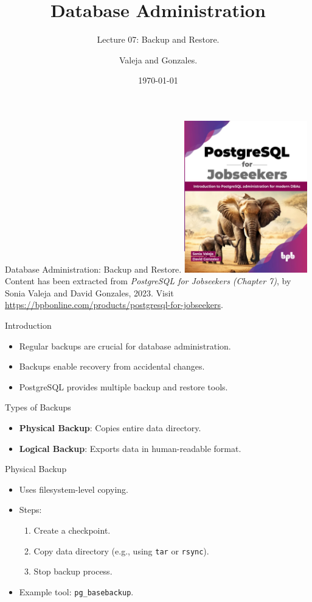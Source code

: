 \documentclass{beamer}
\title[Backup \& Restore]{Database Administration}
\subtitle{Lecture 07: Backup and Restore.}
\author{Valeja and Gonzales.}
\date{\today}
\begin{document}
\frame{\titlepage}

\begin{frame}{Database Administration: Backup and Restore.}
    \centering
    \includegraphics[width=0.4\textwidth]{figures/book_cover}\\
    \vspace{2mm}
    {
        \scriptsize
        Content has been extracted from \textit{PostgreSQL for Jobseekers (Chapter 7)}, by Sonia Valeja and David Gonzales, 2023.  Visit \url{https://bpbonline.com/products/postgresql-for-jobseekers}.\\
    }
\end{frame}

\begin{frame}{Introduction}
    \begin{itemize}
        \item Regular backups are crucial for database administration.
        \item Backups enable recovery from accidental changes.
        \item PostgreSQL provides multiple backup and restore tools.
    \end{itemize}
\end{frame}

\begin{frame}{Types of Backups}
    \begin{itemize}
        \item \textbf{Physical Backup}: Copies entire data directory.
        \item \textbf{Logical Backup}: Exports data in human-readable format.
    \end{itemize}
\end{frame}

\begin{frame}{Physical Backup}
    \begin{itemize}
        \item Uses filesystem-level copying.
        \item Steps:
        \begin{enumerate}
            \item Create a checkpoint.
            \item Copy data directory (e.g., using \texttt{tar} or \texttt{rsync}).
            \item Stop backup process.
        \end{enumerate}
        \item Example tool: \texttt{pg\_basebackup}.
    \end{itemize}
\end{frame}
\end{document}
